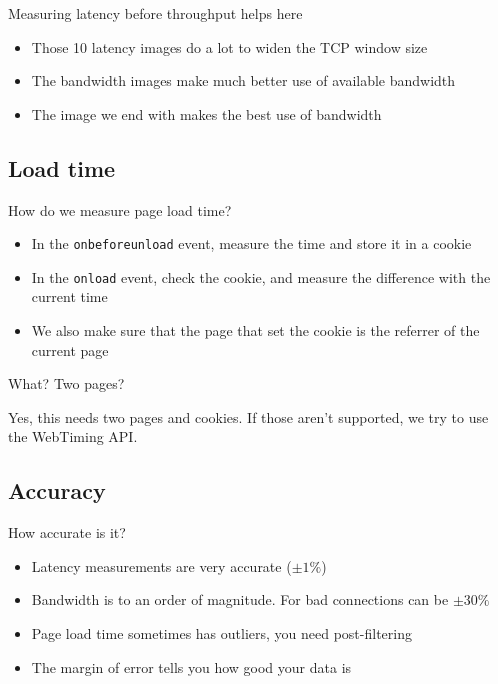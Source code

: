 \documentclass{beamer}
\begin{document}
\begin{frame}{Measuring latency before throughput helps here}
  \begin{itemize}
  \item Those 10 latency images do a lot to widen the TCP window size
  \item The bandwidth images make much better use of available bandwidth
  \item The image we end with makes the best use of bandwidth
  \end{itemize}
\end{frame}

\subsection{Load time}
\begin{frame}{How do we measure page load time?}
  \begin{itemize}
  \item In the \texttt{onbeforeunload} event, measure the time and store it in a cookie
  \item In the \texttt{onload} event, check the cookie, and measure the difference with the current time
  \item We also make sure that the page that set the cookie is the referrer of the current page
  \end{itemize}
\end{frame}

\begin{frame}{What? Two pages?}
  \begin{center}
  Yes, this needs two pages and cookies.  If those aren't supported, we try to use the WebTiming API.
  \end{center}
\end{frame}

\subsection{Accuracy}
\begin{frame}{How accurate is it?}
  \begin{itemize}
  \item Latency measurements are very accurate (\(\pm 1\%\))
  \item Bandwidth is to an order of magnitude. For bad connections can be \(\pm 30\%\)
  \item Page load time sometimes has outliers, you need post-filtering
  \item The margin of error tells you how good your data is
  \end{itemize}
\end{frame}
\end{document}
